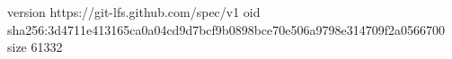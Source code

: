 version https://git-lfs.github.com/spec/v1
oid sha256:3d4711e413165ca0a04cd9d7bcf9b0898bce70e506a9798e314709f2a0566700
size 61332
